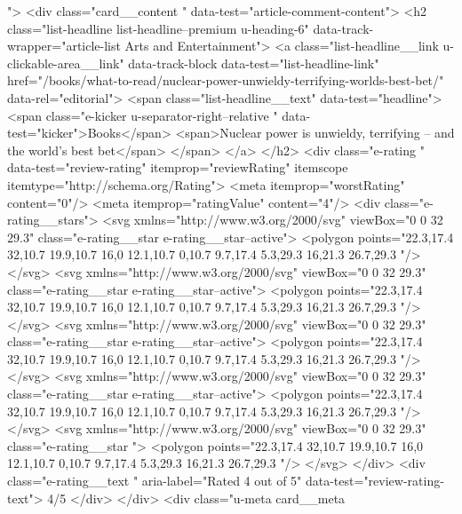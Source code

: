 {{{			 ">
<div class="card__content " data-test="article-comment-content">
<h2 class="list-headline list-headline--premium u-heading-6" data-track-wrapper="article-list Arts and Entertainment">
<a class="list-headline__link u-clickable-area__link" data-track-block data-test="list-headline-link" href="/books/what-to-read/nuclear-power-unwieldy-terrifying-worlds-best-bet/" data-rel="editorial">
<span class="list-headline__text" data-test="headline">
<span class="e-kicker u-separator-right--relative " data-test="kicker">Books</span>
<span>Nuclear power is unwieldy, terrifying – and the world’s best bet</span>
</span>
</a>
</h2>
<div class="e-rating " data-test="review-rating" itemprop="reviewRating" itemscope itemtype="http://schema.org/Rating">
<meta itemprop="worstRating" content="0"/>
<meta itemprop="ratingValue" content="4"/>
<div class="e-rating__stars">
<svg xmlns="http://www.w3.org/2000/svg" viewBox="0 0 32 29.3" class="e-rating__star  e-rating__star--active">
<polygon points="22.3,17.4 32,10.7 19.9,10.7 16,0 12.1,10.7 0,10.7 9.7,17.4 5.3,29.3 16,21.3 26.7,29.3 "/>
</svg>
<svg xmlns="http://www.w3.org/2000/svg" viewBox="0 0 32 29.3" class="e-rating__star  e-rating__star--active">
<polygon points="22.3,17.4 32,10.7 19.9,10.7 16,0 12.1,10.7 0,10.7 9.7,17.4 5.3,29.3 16,21.3 26.7,29.3 "/>
</svg>
<svg xmlns="http://www.w3.org/2000/svg" viewBox="0 0 32 29.3" class="e-rating__star  e-rating__star--active">
<polygon points="22.3,17.4 32,10.7 19.9,10.7 16,0 12.1,10.7 0,10.7 9.7,17.4 5.3,29.3 16,21.3 26.7,29.3 "/>
</svg>
<svg xmlns="http://www.w3.org/2000/svg" viewBox="0 0 32 29.3" class="e-rating__star  e-rating__star--active">
<polygon points="22.3,17.4 32,10.7 19.9,10.7 16,0 12.1,10.7 0,10.7 9.7,17.4 5.3,29.3 16,21.3 26.7,29.3 "/>
</svg>
<svg xmlns="http://www.w3.org/2000/svg" viewBox="0 0 32 29.3" class="e-rating__star  ">
<polygon points="22.3,17.4 32,10.7 19.9,10.7 16,0 12.1,10.7 0,10.7 9.7,17.4 5.3,29.3 16,21.3 26.7,29.3 "/>
</svg>
</div>
<div class="e-rating__text " aria-label="Rated 4 out of 5" data-test="review-rating-text">
4/5
</div>
</div>
<div class="u-meta card__meta
						
}}}
